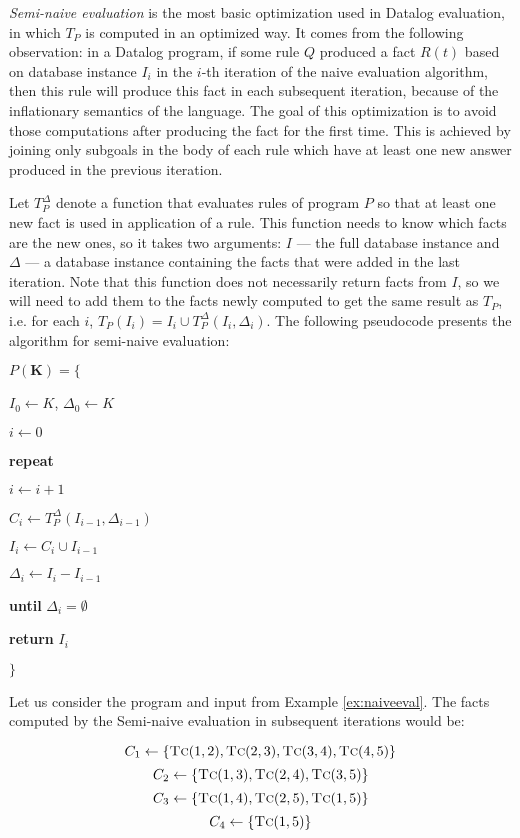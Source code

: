 \emph{Semi-naive evaluation} is the most basic optimization used in Datalog evaluation, in which $T_P$ is computed in an optimized way. It comes from the following observation: in a Datalog program, if some rule $Q$ produced a fact $R(t)$ based on database instance $I_i$ in the $i$-th iteration of the naive evaluation algorithm, then this rule will produce this fact in each subsequent iteration, because of the inflationary semantics of the language. The goal of this optimization is to avoid those computations after producing the fact for the first time. This is achieved by joining only subgoals in the body of each rule which have at least one new answer produced in the previous iteration. 

Let $T^\Delta_P$ denote a function that evaluates rules of program $P$ so that at least one new fact is used in application of a rule. This function needs to know which facts are the new ones, so it takes two arguments: $I$ --- the full database instance and $\Delta$ --- a database instance containing the facts that were added in the last iteration. Note that this function does not necessarily return facts from $I$, so we will need to add them to the facts newly computed to get the same result as $T_P$, i.e. for each $i$, $T_P(I_i) = I_i \cup T_P^\Delta(I_i, \Delta_i)$. The following pseudocode presents the algorithm for semi-naive evaluation: 

\vspace{0.5cm}
\parbox{0.5\textwidth}{
$P(\textbf{K}) = \{$

{\addtolength{\leftskip}{5mm}

$I_0 \leftarrow K$, $\Delta_0 \leftarrow K$

$i \leftarrow 0$

\textbf{repeat}

{\addtolength{\leftskip}{5mm}

$i \leftarrow i + 1$

$C_i \leftarrow T_P^\Delta(I_{i-1}, \Delta_{i-1})$

$I_i \leftarrow C_i \cup I_{i-1}$

$\Delta_i \leftarrow I_i - I_{i-1}$

}

\textbf{until} $\Delta_i = \emptyset$

\textbf{return} $I_i$

}

$\}$
}



\begin{exmp}
Let us consider the program and input from Example \ref{ex:naiveeval}. The facts computed by the Semi-naive evaluation in subsequent iterations would be:

$$C_1 \leftarrow \{\textsc{Tc}(1, 2), \textsc{Tc}(2, 3), \textsc{Tc}(3, 4), \textsc{Tc}(4, 5)\}$$
$$C_2 \leftarrow \{\textsc{Tc}(1, 3), \textsc{Tc}(2, 4), \textsc{Tc}(3, 5)\}$$
$$C_3 \leftarrow \{\textsc{Tc}(1, 4), \textsc{Tc}(2, 5), \textsc{Tc}(1, 5)\}$$
$$C_4 \leftarrow \{\textsc{Tc}(1, 5)\}$$
\label{ex:semieval}
\end{exmp}

